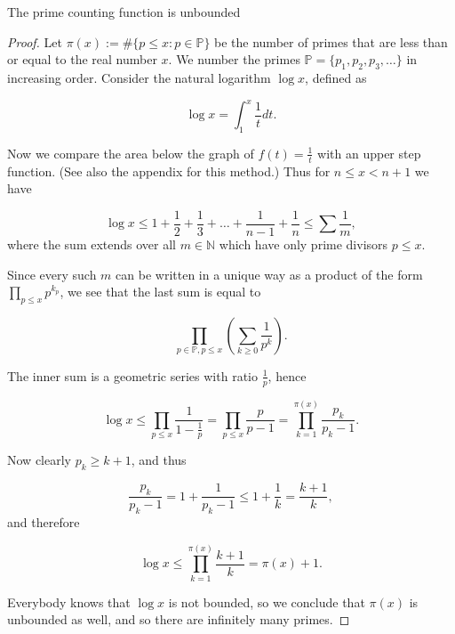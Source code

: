 \begin{theorem}
    \label{thm:fourth_proof}
    \leanok
    The prime counting function is unbounded
\end{theorem}
\begin{proof}
    Let \(\pi(x) := \#\{p \leq x : p \in \mathbb{P}\}\) be the number of primes that are less than or equal to the real number \(x\).
    We number the primes \(\mathbb{P} = \{p_1, p_2, p_3, \dots \}\) in increasing order.
    Consider the natural logarithm \(\log x\), defined as

    \[
    \log x = \int_1^x \frac{1}{t} dt.
    \]

    Now we compare the area below the graph of \(f(t) = \frac{1}{t}\) with an upper step function.
    (See also the appendix for this method.) Thus for \(n \leq x < n+1\) we have

    \[
    \log x \leq 1 + \frac{1}{2} + \frac{1}{3} + \dots + \frac{1}{n-1} + \frac{1}{n} \leq \sum \frac{1}{m},
    \]
    where the sum extends over all \(m \in \mathbb{N}\) which have only prime divisors \(p \leq x\).

    Since every such \(m\) can be written in a unique way as a product of the form \(\prod_{p \leq x} p^{k_p}\),
    we see that the last sum is equal to

    \[
    \prod_{p \in \mathbb{P}, p \leq x} \left( \sum_{k \geq 0} \frac{1}{p^k} \right).
    \]

    The inner sum is a geometric series with ratio \(\frac{1}{p}\), hence

    \[
    \log x \leq \prod_{p \leq x} \frac{1}{1 - \frac{1}{p}} = \prod_{p \leq x} \frac{p}{p - 1} = \prod_{k=1}^{\pi(x)} \frac{p_k}{p_k - 1}.
    \]

    Now clearly \(p_k \geq k+1\), and thus

    \[
    \frac{p_k}{p_k - 1} = 1 + \frac{1}{p_k - 1} \leq 1 + \frac{1}{k} = \frac{k+1}{k},
    \]
    and therefore

    \[
    \log x \leq \prod_{k=1}^{\pi(x)} \frac{k+1}{k} = \pi(x) + 1.
    \]

    Everybody knows that \(\log x\) is not bounded, so we conclude that \(\pi(x)\) is unbounded as well, and so there are infinitely many primes.
\end{proof}


